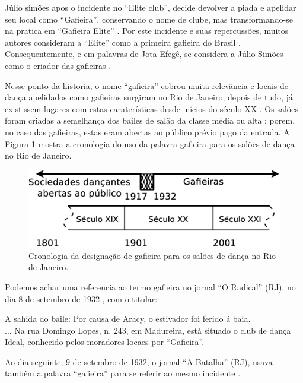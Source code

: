 Júlio simões apos o incidente no ``Elite club'', 
decide devolver a piada e apelidar seu local como 
``Gafieira'', conservando o nome de clube, 
mas transformando-se na pratica em ``Gafieira Elite'' \cite[pp. 79]{moura1995tia} \cite[pp. 6 - Tribuna Bis]{gafieiraaredeout3}.
Por este incidente e suas repercussões, 
muitos autores consideram a ``Elite'' como a primeira gafieira do Brasil \cite{cabral2016elisete} \cite[pp. 84]{cabral1996escolas}.
Consequentemente, e em palavras de Jota Efegê, 
se considera a Júlio Simões como o criador das gafieiras \cite[pp. 3 - cad. 3]{juliosimoes}.

Nesse ponto da historia, 
o nome ``gafieira'' cobrou muita relevância e locais de dança apelidados como gafieiras surgiram no Rio de Janeiro;
depois de tudo, já existissem lugares com estas caraterísticas desde inícios do século XX \cite[pp. 49]{diniz2003almanaque}.
Os salões foram criadas a semelhança dos bailes de salão da classe média ou alta \cite[pp. 78]{coutinho2006cronistas}; 
porem, no caso das gafieiras, estas eram abertas ao público prévio pago da entrada.
A Figura \ref{fig:gafieiracrono} mostra a cronologia do uso da palavra gafieira para os salões de dança no Rio de Janeiro.
\begin{figure}[h]
  \centering
    \includegraphics[width=1.0\textwidth]{chapters/cap-historia-gafieiras/gafieira-crono.eps}
  \caption{Cronologia da designação de gafieira para os salões de dança no Rio de Janeiro.}
  \label{fig:gafieiracrono}
\end{figure}


Podemos achar uma referencia ao termo gafieira no jornal ``O Radical'' (RJ),
no dia 8 de setembro de 1932 \cite[pp. 12]{gafieirajournaloradical1},
com o titular:
\begin{citando}%
A sahida do baile: Por causa de Aracy, o estivador foi ferido á baia.\\
... Na rua Domingo Lopes, n. 243, em Madureira, está situado o club de dança Ideal, 
conhecido pelos moradores locaes por ``Gafieira''.
\end{citando} 
Ao dia seguinte, 9 de setembro de 1932, o jornal ``A Batalha'' (RJ), 
usava também a palavra ``gafieira'' para se referir ao mesmo incidente \cite[pp. 8]{gafieirajournalabatalha1}.

